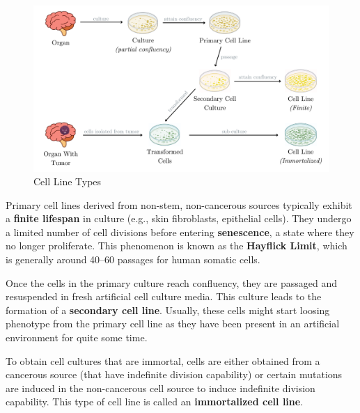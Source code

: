 \documentclass[12pt]{article}
\begin{document}
\begin{figure}[h]
    \centering
    \includegraphics[width=1\textwidth]{figures/chapter_1/cell_cultures.png}
    \caption{Cell Line Types}\label{fig:cell_line_types}
\end{figure}

Primary cell lines derived from non-stem, non-cancerous sources typically
exhibit a \textbf{finite lifespan} in culture (e.g., skin fibroblasts,
epithelial cells). They undergo a limited number of cell divisions before
entering \textbf{senescence}, a state where they no longer proliferate. This
phenomenon is known as the \textbf{Hayflick Limit}, which is generally around
40--60 passages for human somatic cells.

Once the cells in the primary culture reach confluency, they are passaged and
resuspended in fresh artificial cell culture media. This culture leads to the
formation of a \textbf{secondary cell line}. Usually, these cells might start
loosing phenotype from the primary cell line as they have been present in an
artificial environment for quite some time.

To obtain cell cultures that are immortal, cells are either obtained from a
cancerous source (that have indefinite division capability) or certain
mutations are induced in the non-cancerous cell source to induce indefinite
division capability. This type of cell line is called an \textbf{immortalized
    cell line}.
\end{document}
